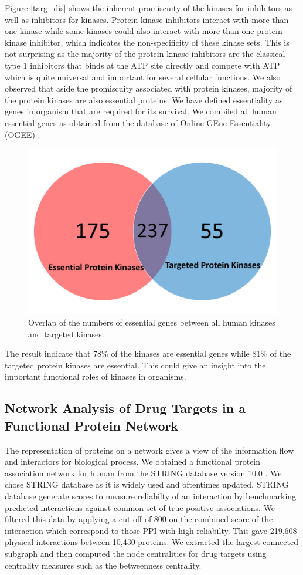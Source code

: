 \documentclass[a4paper, 11pt]{article}
\begin{document}
Figure \ref{targ_dis} shows the inherent promiscuity of the kinases for inhibitors as well as inhibitors for kinases. Protein kinase inhibitors interact with more than one kinase  while some kinases could also interact with more than one protein kinase inhibitor, which indicates the non-specificity of these kinase sets. This is not surprising as the majority of the protein kinase inhibitors are the classical type 1 inhibitors that binds at the ATP site directly and compete with ATP which is quite universal and important for several cellular functions.
We also observed that aside the promiscuity associated with protein kinases, majority of the protein kinases are also essential proteins. We have defined essentiality as genes in organism that are required for its survival. We compiled all human essential genes as obtained from the database of Online GEne Essentiality (OGEE) \cite{chen2017ogee}. 

\begin{figure}[H]
	\includegraphics[width=0.7\linewidth]{figures/essential_kinase.png}
	\centering
	\caption{Overlap of the numbers of essential genes between all human kinases and targeted kinases.}
		\label{essent_genes}
\end{figure}
The result indicate that 78\% of the kinases are essential genes while 81\% of the targeted protein kinases are essential. This could give an insight into the important functional roles of kinases in organisms.
\subsection*{Network Analysis of Drug Targets in a Functional Protein Network}
The representation of proteins on a network gives a view of the information flow and interactors for biological process. We obtained a functional protein association network for human from the STRING database version 10.0 \cite{szklarczyk2014string}. We chose STRING database as it is widely used and oftentimes updated. STRING database generate scores  to measure reliabilty of an interaction by benchmarking predicted interactions against common set of true positive associations. We filtered this data by applying a cut-off of 800 on the combined score of the interaction which correspond to those PPI with high reliabilty. This gave 219,608 physical interactions between 10,430 proteins. We extracted the largest connected subgraph and then computed the node centralities for drug targets using centrality measures such as the betweenness centrality.
\end{document}
